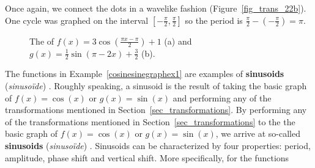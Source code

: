 \begin{example}
\begin{enumerate}
Once again, we connect the dots in a wavelike fashion (Figure~\ref{fig_trans_22b}). One cycle was graphed on the interval $\left[ -\frac{\pi}{2}, \frac{\pi}{2}\right]$ so the period is $\frac{\pi}{2} - \left(-\frac{\pi}{2}\right) = \pi$. 
\end{enumerate}
\begin{figure}[H]
			\centering
\centerline{
\hspace{0.1cm}
}
	\caption{The of $f(x) = 3 \cos\left(\frac{\pi x - \pi}{2}\right) + 1$ (a) and $g(x) = \frac{1}{2} \sin(\pi - 2x) + \frac{3}{2}$ (b).}
\end{figure}

\end{example}
\fi

\ifcourse
\ifcalculus
The functions in Example~\ref{cosinesinegraphex1} are examples of \textbf{sinusoids} (\textit{sinuso\"ide}) . Roughly speaking, a sinusoid is the result of taking the basic graph of $f(x) = \cos(x)$ or $g(x) = \sin(x)$ and performing any of the transformations mentioned in Section~\ref{sec_transformations}.
\fi 
\ifanalysis
By performing any of the transformations mentioned in Section~\ref{sec_transformations} to the the basic graph of $f(x) = \cos(x)$ or $g(x) = \sin(x)$, we arrive at so-called \textbf{sinusoids} (\textit{sinuso\"ide}) .
\fi
Sinusoids can be characterized by four properties:  period, amplitude, phase shift and vertical shift. More specifically, for the functions

